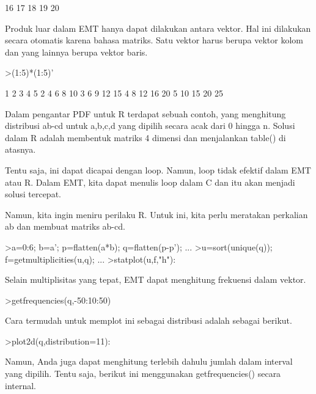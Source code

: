 \documentclass[a4paper,10pt]{article}
\begin{document}
\begin{eulernotebook}
\begin{euleroutput}
         16        17        18        19        20 
\end{euleroutput}
\begin{eulercomment}
Produk luar dalam EMT hanya dapat dilakukan antara vektor. Hal ini
dilakukan secara otomatis karena bahasa matriks. Satu vektor harus
berupa vektor kolom dan yang lainnya berupa vektor baris.
\end{eulercomment}
\begin{eulerprompt}
>(1:5)*(1:5)'
\end{eulerprompt}
\begin{euleroutput}
          1         2         3         4         5 
          2         4         6         8        10 
          3         6         9        12        15 
          4         8        12        16        20 
          5        10        15        20        25 
\end{euleroutput}
\begin{eulercomment}
Dalam pengantar PDF untuk R terdapat sebuah contoh, yang menghitung
distribusi ab-cd untuk a,b,c,d yang dipilih secara acak dari 0 hingga
n. Solusi dalam R adalah membentuk matriks 4 dimensi dan menjalankan
table() di atasnya.

Tentu saja, ini dapat dicapai dengan loop. Namun, loop tidak efektif
dalam EMT atau R. Dalam EMT, kita dapat menulis loop dalam C dan itu
akan menjadi solusi tercepat.

Namun, kita ingin meniru perilaku R. Untuk ini, kita perlu meratakan
perkalian ab dan membuat matriks ab-cd.
\end{eulercomment}
\begin{eulerprompt}
>a=0:6; b=a'; p=flatten(a*b); q=flatten(p-p'); ...
>u=sort(unique(q)); f=getmultiplicities(u,q); ...
>statplot(u,f,"h"):
\end{eulerprompt}
\begin{eulercomment}
Selain multiplisitas yang tepat, EMT dapat menghitung frekuensi dalam
vektor.
\end{eulercomment}
\begin{eulerprompt}
>getfrequencies(q,-50:10:50)
\end{eulerprompt}
\begin{euleroutput}
  [0,  23,  132,  316,  602,  801,  333,  141,  53,  0]
\end{euleroutput}
\begin{eulercomment}
Cara termudah untuk memplot ini sebagai distribusi adalah sebagai
berikut.
\end{eulercomment}
\begin{eulerprompt}
>plot2d(q,distribution=11):
\end{eulerprompt}
\begin{eulercomment}
Namun, Anda juga dapat menghitung terlebih dahulu jumlah dalam
interval yang dipilih. Tentu saja, berikut ini menggunakan
getfrequencies() secara internal.


\end{eulercomment}
\end{eulernotebook}
\end{document}
